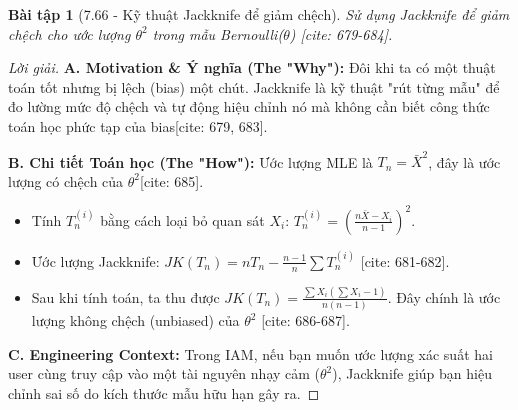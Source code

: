 \documentclass[8pt,a4paper]{article}
\newtheorem{exercise}{Bài tập}
\newenvironment{solution}{\begin{proof}[Lời giải]}{\end{proof}}
\begin{document}
\begin{exercise}[7.66 - Kỹ thuật Jackknife để giảm chệch]
Sử dụng Jackknife để giảm chệch cho ước lượng $\theta^2$ trong mẫu Bernoulli($\theta$) [cite: 679-684].
\end{exercise}

\begin{solution}
\textbf{A. Motivation \& Ý nghĩa (The "Why"):} Đôi khi ta có một thuật toán tốt nhưng bị lệch (bias) một chút. Jackknife là kỹ thuật "rút từng mẫu" để đo lường mức độ chệch và tự động hiệu chỉnh nó mà không cần biết công thức toán học phức tạp của bias[cite: 679, 683].



\textbf{B. Chi tiết Toán học (The "How"):}
Ước lượng MLE là $T_n = \bar{X}^2$, đây là ước lượng có chệch của $\theta^2$[cite: 685].
\begin{itemize}
    \item Tính $T_n^{(i)}$ bằng cách loại bỏ quan sát $X_i$: $T_n^{(i)} = (\frac{n\bar{X} - X_i}{n-1})^2$.
    \item Ước lượng Jackknife: $JK(T_n) = nT_n - \frac{n-1}{n} \sum T_n^{(i)}$ [cite: 681-682].
    \item Sau khi tính toán, ta thu được $JK(T_n) = \frac{\sum X_i (\sum X_i - 1)}{n(n-1)}$. Đây chính là ước lượng không chệch (unbiased) của $\theta^2$ [cite: 686-687].
\end{itemize}

\textbf{C. Engineering Context:} Trong IAM, nếu bạn muốn ước lượng xác suất hai user cùng truy cập vào một tài nguyên nhạy cảm ($\theta^2$), Jackknife giúp bạn hiệu chỉnh sai số do kích thước mẫu hữu hạn gây ra.
\end{solution}
\end{document}
